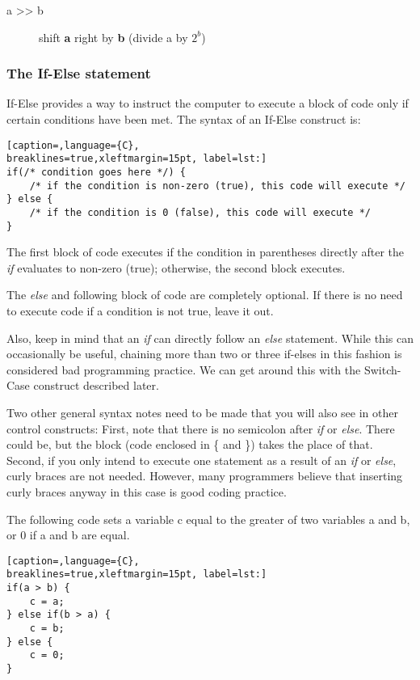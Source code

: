 \begin{description}
	\item[a \textgreater{}\textgreater{} b] shift \textbf{a} right by \textbf{b} (divide a by \(2^b\))
\end{description}

\subsubsection{The If-Else statement}
If-Else provides a way to instruct the computer to execute a block of code only
if certain conditions have been met. The syntax of an If-Else construct is:
\lstset{basicstyle=\scriptsize, numbers=left, captionpos=b, tabsize=4}
\begin{lstlisting}[caption=,language={C},
breaklines=true,xleftmargin=15pt, label=lst:]
if(/* condition goes here */) {
	/* if the condition is non-zero (true), this code will execute */
} else {
	/* if the condition is 0 (false), this code will execute */
}
\end{lstlisting}

The first block of code executes if the condition in parentheses directly after
the \emph{if} evaluates to non-zero (true); otherwise, the second block
executes.

The \emph{else} and following block of code are completely optional. If there
is no need to execute code if a condition is not true, leave it out.

Also, keep in mind that an \emph{if} can directly follow an \emph{else}
statement. While this can occasionally be useful, chaining more than two or
three if-elses in this fashion is considered bad programming practice. We can
get around this with the Switch-Case construct described later.

Two other general syntax notes need to be made that you will also see in other
control constructs: First, note that there is no semicolon after \emph{if} or
\emph{else}. There could be, but the block (code enclosed in \{ and \}) takes
the place of that. Second, if you only intend to execute one statement as a
result of an \emph{if} or \emph{else}, curly braces are not needed. However,
many programmers believe that inserting curly braces anyway in this case is
good coding practice.

The following code sets a variable c equal to the greater of two variables a
and b, or 0 if a and b are equal.
\lstset{basicstyle=\scriptsize, numbers=left, captionpos=b, tabsize=4}
\begin{lstlisting}[caption=,language={C},
breaklines=true,xleftmargin=15pt, label=lst:]
if(a > b) {
	c = a;
} else if(b > a) {
	c = b;
} else {
	c = 0;
}
\end{lstlisting} 

